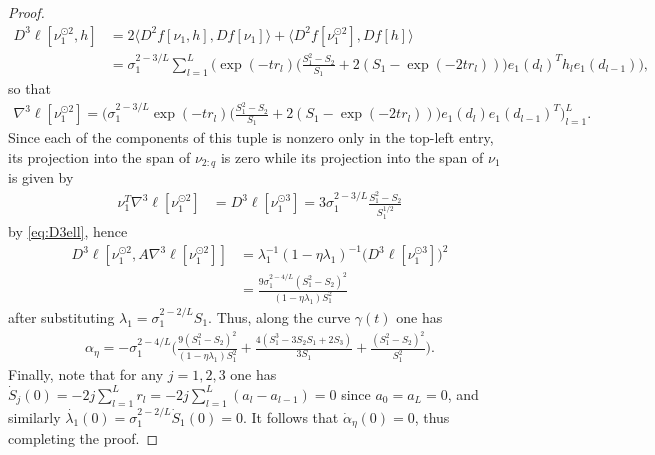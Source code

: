 \documentclass{article}
\theoremstyle{plain}
\theoremstyle{definition}
\theoremstyle{remark}
\begin{document}
\begin{proof}
\begin{align}
        D^3\ell[\nu_1^{\odot 2},h] &= 2\langle D^2f[\nu_1,h],Df[\nu_1]\rangle + \langle D^2f[\nu_1^{\odot 2}],Df[h]\rangle\\&=\sigma_1^{2-3/L}\sum_{l=1}^L\bigg(\exp(-tr_l)\bigg(\frac{S_1^2-S_2}{S_1} + 2(S_1-\exp(-2tr_l))\bigg)e_1(d_l)^Th_le_1(d_{l-1})\bigg),
    \end{align}
    so that
    \begin{align}
        \nabla^3\ell[\nu_1^{\odot 2}] = \bigg(\sigma_1^{2-3/L}\exp(-tr_l)\bigg(\frac{S_1^2-S_2}{S_1} + 2(S_1-\exp(-2tr_l))\bigg)e_1(d_l)e_1(d_{l-1})^T\bigg)_{l=1}^L.
    \end{align}
    Since each of the components of this tuple is nonzero only in the top-left entry, its projection into the span of $\nu_{2:q}$ is zero while its projection into the span of $\nu_1$ is given by
    \begin{align}
        \nu_1^T\nabla^3\ell[\nu_1^{\odot 2}] &= D^3\ell[\nu_1^{\odot 3}] = 3\sigma_1^{2-3/L}\frac{S_1^2-S_2}{S_1^{1/2}}
    \end{align}
    by \eqref{eq:D3ell}, hence
    \begin{align}
        D^3\ell[\nu_1^{\odot 2},A\nabla^3\ell[\nu_1^{\odot 2}]] &= \lambda_1^{-1}(1-\eta\lambda_1)^{-1}\big(D^3\ell[\nu_1^{\odot 3}]\big)^2\\&=\frac{9\sigma_1^{2-4/L}(S_1^2-S_2)^2}{(1-\eta\lambda_1)S_1^2}
    \end{align}
    after substituting $\lambda_1 = \sigma_1^{2-2/L}S_1$. Thus, along the curve $\gamma(t)$ one has
    \begin{align}
        \alpha_{\eta} = -\sigma_1^{2-4/L}\bigg(\frac{9(S_1^2-S_2)^2}{(1-\eta\lambda_1)S_1^2} + \frac{4(S_1^3-3S_2S_1+2S_3)}{3S_1} + \frac{(S_1^2-S_2)^2}{S_1^2}\bigg).
    \end{align}
    Finally, note that for any $j=1,2,3$ one has $\dot{S}_j(0) = -2j\sum_{l=1}^Lr_l = -2j\sum_{l=1}^L(a_l-a_{l-1}) = 0$ since $a_0 = a_L = 0$, and similarly $\dot{\lambda_1}(0) = \sigma_1^{2-2/L}\dot{S}_1(0) = 0$. It follows that $\dot{\alpha}_{\eta}(0) = 0$, thus completing the proof.
\end{proof}




% 
\end{document}
